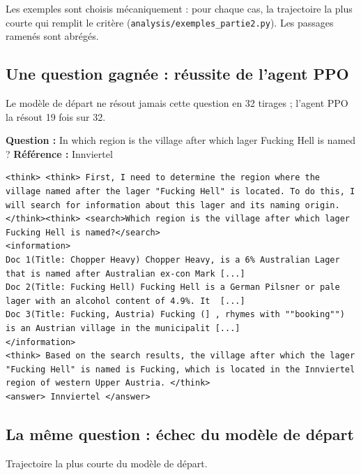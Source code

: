 
Les exemples sont choisis mécaniquement : pour chaque cas, la trajectoire la plus courte qui remplit le critère (\texttt{analysis/exemples\_partie2.py}). Les passages ramenés sont abrégés.

\subsection*{Une question gagnée : réussite de l'agent PPO}
Le modèle de départ ne résout jamais cette question en 32 tirages ; l'agent PPO la résout 19 fois sur 32.

\noindent\textbf{Question :} In which region is the village after which lager Fucking Hell is named ? \quad \textbf{Référence :} Innviertel
\begin{Verbatim}[breaklines=true, breakanywhere=true, fontsize=\scriptsize, frame=single]
<think> <think> First, I need to determine the region where the village named after the lager "Fucking Hell" is located. To do this, I will search for information about this lager and its naming origin. </think><think> <search>Which region is the village after which lager Fucking Hell is named?</search>
<information>
Doc 1(Title: Chopper Heavy) Chopper Heavy, is a 6% Australian Lager that is named after Australian ex-con Mark [...]
Doc 2(Title: Fucking Hell) Fucking Hell is a German Pilsner or pale lager with an alcohol content of 4.9%. It  [...]
Doc 3(Title: Fucking, Austria) Fucking (] , rhymes with ""booking"") is an Austrian village in the municipalit [...]
</information>
<think> Based on the search results, the village after which the lager "Fucking Hell" is named is Fucking, which is located in the Innviertel region of western Upper Austria. </think>
<answer> Innviertel </answer>
\end{Verbatim}

\subsection*{La même question : échec du modèle de départ}
Trajectoire la plus courte du modèle de départ.

